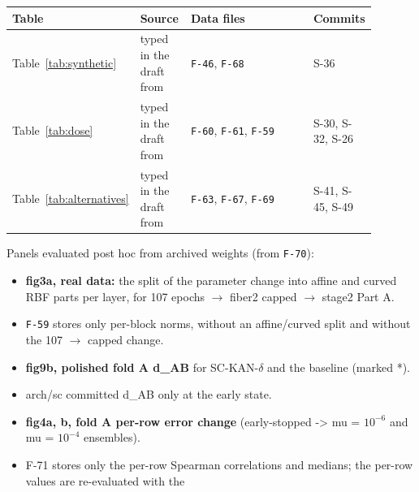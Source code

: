 {\footnotesize\setlength{\tabcolsep}{3pt}
\begin{longtable}{R{0.14\linewidth} R{0.14\linewidth} R{0.45\linewidth} R{0.16\linewidth}}
\toprule
Table & Source & Data files & Commits \\
\midrule
\endhead
Table~\ref{tab:synthetic} & typed in the draft from & \texttt{F-46}, \texttt{F-68} & S-36 \\
Table~\ref{tab:dose} & typed in the draft from & \texttt{F-60}, \texttt{F-61}, \texttt{F-59} & S-30, S-32, S-26 \\
Table~\ref{tab:alternatives} & typed in the draft from & \texttt{F-63}, \texttt{F-67}, \texttt{F-69} & S-41, S-45, S-49 \\
\bottomrule
\end{longtable}}
\noindent Panels evaluated post hoc from archived weights (from \texttt{F-70}):

\begin{itemize}
  \item \textbf{fig3a, real data:} the split of the parameter change into affine and curved RBF parts per layer, for 107 epochs $\to$\allowbreak{} fiber2 capped $\to$\allowbreak{} stage2 Part A.
  \item \texttt{F-59} stores only per-block norms, without an affine/curved split and without the 107 $\to$\allowbreak{} capped change.
  \item \textbf{fig9b, polished fold A d\_AB} for SC-KAN-$\delta$ and the baseline (marked *).
  \item arch/sc committed d\_AB only at the early state.
  \item \textbf{fig4a, b, fold A per-row error change} (early-stopped -> mu = $10^{-6}$ and mu = $10^{-4}$ ensembles).
  \item F-71 stores only the per-row Spearman correlations and medians; the per-row values are re-evaluated with the
\end{itemize}